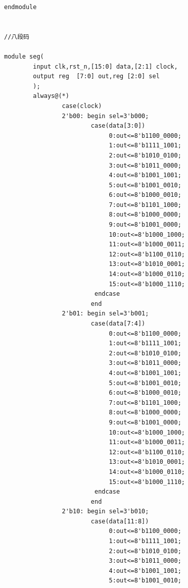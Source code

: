 \documentclass[UTF8]{ctexart}
\begin{document}
\begin{verbatim}
endmodule


//八段码

module seg(
        input clk,rst_n,[15:0] data,[2:1] clock,
        output reg  [7:0] out,reg [2:0] sel
        );
        always@(*)
                case(clock)
                2'b00: begin sel=3'b000;
                        case(data[3:0])    
                             0:out<=8'b1100_0000;
                             1:out<=8'b1111_1001;
                             2:out<=8'b1010_0100;
                             3:out<=8'b1011_0000;                    
                             4:out<=8'b1001_1001;
                             5:out<=8'b1001_0010;
                             6:out<=8'b1000_0010;
                             7:out<=8'b1101_1000;
                             8:out<=8'b1000_0000;
                             9:out<=8'b1001_0000;
                             10:out<=8'b1000_1000;
                             11:out<=8'b1000_0011;
                             12:out<=8'b1100_0110;
                             13:out<=8'b1010_0001;
                             14:out<=8'b1000_0110;
                             15:out<=8'b1000_1110;
                         endcase
                        end
                2'b01: begin sel=3'b001;
                        case(data[7:4])    
                             0:out<=8'b1100_0000;
                             1:out<=8'b1111_1001;
                             2:out<=8'b1010_0100;
                             3:out<=8'b1011_0000;                    
                             4:out<=8'b1001_1001;
                             5:out<=8'b1001_0010;
                             6:out<=8'b1000_0010;
                             7:out<=8'b1101_1000;
                             8:out<=8'b1000_0000;
                             9:out<=8'b1001_0000;
                             10:out<=8'b1000_1000;
                             11:out<=8'b1000_0011;
                             12:out<=8'b1100_0110;
                             13:out<=8'b1010_0001;
                             14:out<=8'b1000_0110;
                             15:out<=8'b1000_1110;
                         endcase
                        end
                2'b10: begin sel=3'b010;
                        case(data[11:8])    
                             0:out<=8'b1100_0000;
                             1:out<=8'b1111_1001;
                             2:out<=8'b1010_0100;
                             3:out<=8'b1011_0000;                    
                             4:out<=8'b1001_1001;
                             5:out<=8'b1001_0010;

\end{verbatim}
\end{document}
